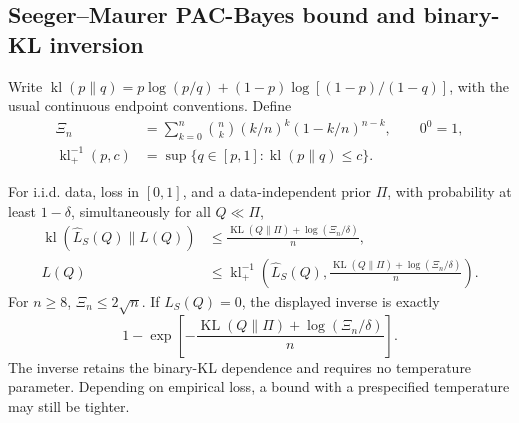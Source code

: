 \subsection{Seeger--Maurer PAC-Bayes bound and binary-KL inversion}
\label{app:sharp-PAC-kl}
Write $\operatorname{kl}(p\|q)=p\log(p/q)+(1-p)\log[(1-p)/(1-q)]$,
with the usual continuous endpoint conventions. Define
\begin{align}
 \Xi_n&=\sum_{k=0}^n\binom nk(k/n)^k(1-k/n)^{n-k},\qquad 0^0=1,\\
 \operatorname{kl}^{-1}_+(p,c)
 &=\sup\{q\in[p,1]:\operatorname{kl}(p\|q)\le c\}.
\end{align}

\begin{theorem}
\label{thm:Seeger-Maurer}
For i.i.d. data, loss in $[0,1]$, and a data-independent prior $\Pi$, with
probability at least $1-\delta$, simultaneously for all $Q\ll\Pi$,
\begin{align}
 \operatorname{kl}(\widehat L_S(Q)\|L(Q))
 &\le\frac{\operatorname{KL}(Q\|\Pi)+\log(\Xi_n/\delta)}n,\\
 L(Q)&\le\operatorname{kl}^{-1}_+\left(\widehat L_S(Q),
           \frac{\operatorname{KL}(Q\|\Pi)+\log(\Xi_n/\delta)}n\right).
 \label{eq:PAC-kl-inverse}
\end{align}
For $n\ge8$, $\Xi_n\le2\sqrt n$. If $\widehat L_S(Q)=0$, the displayed
inverse is exactly
\begin{equation}
 1-\exp\left[-\frac{\operatorname{KL}(Q\|\Pi)+\log(\Xi_n/\delta)}n\right].
 \label{eq:zero-loss-PAC-kl}
\end{equation}
The inverse retains the binary-KL dependence and requires no temperature
parameter. Depending on empirical loss, a bound with a prespecified
temperature may still be tighter.
\end{theorem}
